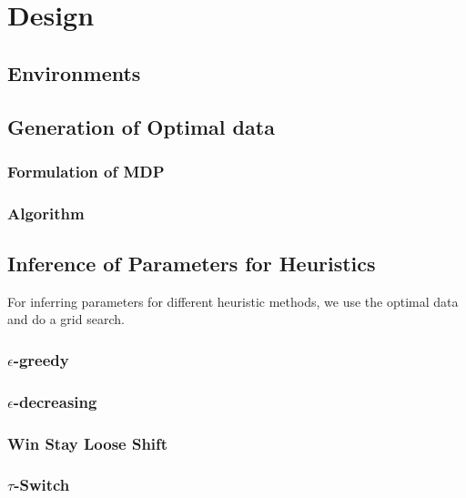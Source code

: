 \section{Design}
\label{design}


\subsection{Environments}

\subsection{Generation of Optimal data}
\subsubsection{Formulation of MDP}

\subsubsection{Algorithm}



\subsection{Inference of Parameters for Heuristics}
For inferring parameters for different heuristic methods, we use the optimal data and do a grid search. 

\subsubsection{$\epsilon$-greedy}

\subsubsection{$\epsilon$-decreasing}

\subsubsection{Win Stay Loose Shift}

\subsubsection{$\tau$-Switch}


